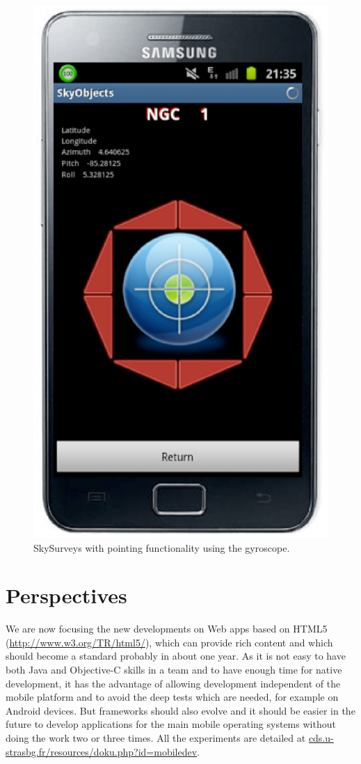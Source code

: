 \begin{figure}[h]
\includegraphics[scale=0.28]{part5/Schaaff_O28/O28_f6.eps}
\caption{SkySurveys with pointing functionality using the gyroscope.} 
\label{O28:3}
\end{figure}

\section{Perspectives}
We are now focusing the new developments on Web apps based on HTML5 (\url{http://www.w3.org/TR/html5/}), which can provide rich content and which should become a standard probably in about one year. As it is not easy to have both Java and Objective-C skills in a team and to have enough time for native development, it has the advantage of allowing development independent of the mobile platform and to avoid the deep tests which are needed, for example on Android devices. 
But frameworks should also evolve and it should be easier in the future to develop applications for the main mobile operating systems without doing the work two or three times.
All the experiments are detailed at \url{cds.u-strasbg.fr/resources/doku.php?id=mobiledev}.

